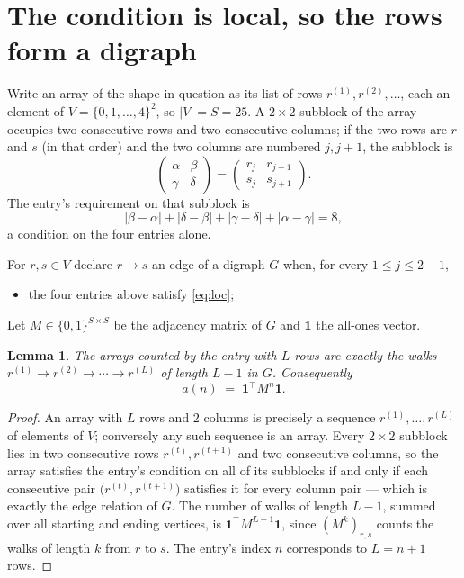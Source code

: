 \documentclass[11pt,a4paper]{article}
\theoremstyle{plain}
\newtheorem{lemma}[theorem]{Lemma}
\theoremstyle{definition}
\begin{document}
\section{The condition is local, so the rows form a digraph}

Write an array of the shape in question as its list of rows
$r^{(1)},r^{(2)},\dots$, each an element of
$V=\{0,1,\dots,4\}^{2}$, so $|V|=S=25$. A $2\times2$ subblock of the array
occupies two consecutive rows and two consecutive columns; if the two rows are $r$
and $s$ (in that order) and the two columns are numbered $j,j+1$,
the subblock is
\[
\begin{pmatrix}\alpha&\beta\\\gamma&\delta\end{pmatrix}=\begin{pmatrix}r_j&r_{j+1}\\s_j&s_{j+1}\end{pmatrix}.
\]
The entry's requirement on that subblock is
\begin{equation}\label{eq:loc}
|\beta-\alpha|+|\delta-\beta|+|\gamma-\delta|+|\alpha-\gamma|=8,
\end{equation}
a condition on the four entries alone.

For $r,s\in V$ declare $r\to s$ an edge of a digraph $G$ when, for every
$1\le j\le 2-1$,
\begin{itemize}
\item the four entries above satisfy \eqref{eq:loc};

\end{itemize}
Let $M\in\{0,1\}^{S\times S}$ be the adjacency matrix of $G$ and $\mathbf{1}$ the
all-ones vector.

\begin{lemma}\label{lem:walk}
The arrays counted by the entry with $L$ rows are exactly the walks
$r^{(1)}\to r^{(2)}\to\cdots\to r^{(L)}$ of length $L-1$ in $G$. Consequently
\[
a(n)\;=\;\mathbf{1}^{\!\top}M^{n}\mathbf{1} .
\]
\end{lemma}

\begin{proof}
An array with $L$ rows and $2$ columns is precisely a sequence
$r^{(1)},\dots,r^{(L)}$ of elements of $V$; conversely any such sequence is an array.
Every $2\times2$ subblock lies in two consecutive rows $r^{(t)},r^{(t+1)}$ and two
consecutive columns, so the array satisfies the entry's condition on all of its subblocks
if and only if each consecutive pair $\bigl(r^{(t)},r^{(t+1)}\bigr)$ satisfies it for
every column pair --- which is exactly the edge relation of $G$. The number of walks of
length $L-1$, summed over all starting and ending vertices, is
$\mathbf{1}^{\!\top}M^{L-1}\mathbf{1}$, since $(M^{k})_{r,s}$ counts the walks of
length $k$ from $r$ to $s$. The entry's index $n$ corresponds to $L=n+1$ rows.
\end{proof}
\end{document}

